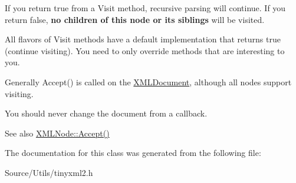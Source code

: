 If you return \textquotesingle{}true\textquotesingle{} from a Visit method, recursive parsing will continue. If you return false, {\bfseries no children of this node or its siblings} will be visited.

All flavors of Visit methods have a default implementation that returns \textquotesingle{}true\textquotesingle{} (continue visiting). You need to only override methods that are interesting to you.

Generally Accept() is called on the \mbox{\hyperlink{classtinyxml2_1_1_x_m_l_document}{X\+M\+L\+Document}}, although all nodes support visiting.

You should never change the document from a callback.

\begin{DoxySeeAlso}{See also}
\mbox{\hyperlink{classtinyxml2_1_1_x_m_l_node_a81e66df0a44c67a7af17f3b77a152785}{X\+M\+L\+Node\+::\+Accept()}} 
\end{DoxySeeAlso}


The documentation for this class was generated from the following file\+:\begin{DoxyCompactItemize}
\item 
Source/\+Utils/tinyxml2.\+h\end{DoxyCompactItemize}

